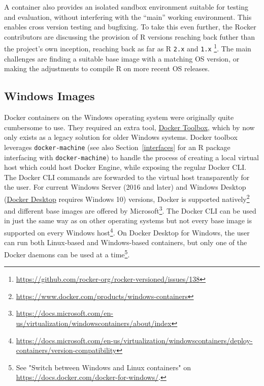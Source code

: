 A container also provides an isolated sandbox environment suitable for
testing and evaluation, without interfering with the ``main'' working
environment. This enables cross version testing and bugfixing. To take
this even further, the Rocker contributors are discussing the provision
of R versions reaching back futher than the project's own inception,
reaching back as far as R \texttt{2.x} and \texttt{1.x}
\footnote{\href{https://github.com/rocker-org/rocker-versioned/issues/138}{https://github.com/rocker-org/rocker-versioned/issues/138}}.
The main challenges are finding a suitable base image with a matching OS
version, or making the adjustments to compile R on more recent OS
releases.

\hypertarget{windows-images}{%
\subsection{Windows Images}\label{windows-images}}

Docker containers on the Windows operating system were originally quite
cumbersome to use. They required an extra tool,
\href{https://docs.docker.com/toolbox/}{Docker Toolbox}, which by now
only exists as a legacy solution for older Windows systems. Docker
toolbox leverages \texttt{docker-machine} (see also
Section~\ref{interfaces} for an R package interfacing with
\texttt{docker-machine}) to handle the process of creating a local
virtual host which could host Docker Engine, while exposing the regular
Docker CLI. The Docker CLI commands are forwarded to the virtual host
transparently for the user. For current Windows Server (2016 and later)
and Windows Desktop
(\href{https://www.docker.com/products/docker-desktop}{Docker Desktop}
requires Windows 10) versions, Docker is supported
natively\footnote{\href{https://www.docker.com/products/windows-containers}{https://www.docker.com/products/windows-containers}}
and different base images are offered by
Microsoft\footnote{\href{https://docs.microsoft.com/en-us/virtualization/windowscontainers/about/index}{https://docs.microsoft.com/en-us/virtualization/windowscontainers/about/index}}.
The Docker CLI can be used in just the same way as on other operating
systems but not every base image is supported on every Windows
host\footnote{\href{https://docs.microsoft.com/en-us/virtualization/windowscontainers/deploy-containers/version-compatibility}{https://docs.microsoft.com/en-us/virtualization/windowscontainers/deploy-containers/version-compatibility}}.
On Docker Desktop for Windows, the user can run both Linux-based and
Windows-based containers, but only one of the Docker daemons can be used
at a
time\footnote{See "Switch between Windows and Linux containers" on \href{https://docs.docker.com/docker-for-windows/}{https://docs.docker.com/docker-for-windows/}.}.

